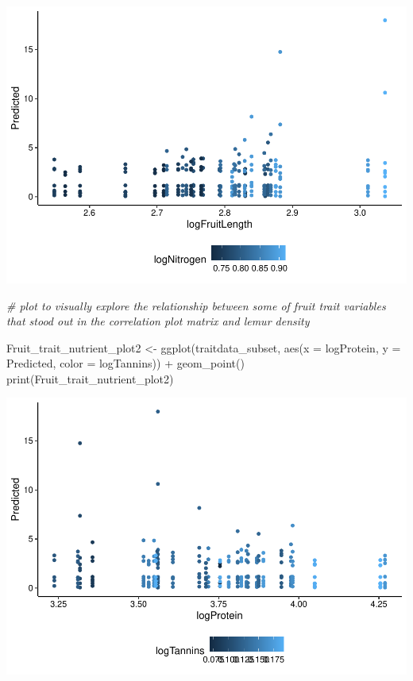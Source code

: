 \documentclass[
  12pt,
]{article}
\newenvironment{Shaded}{\begin{snugshade}}{\end{snugshade}}
\newcommand{\AttributeTok}[1]{\textcolor[rgb]{0.77,0.63,0.00}{#1}}
\newcommand{\CommentTok}[1]{\textcolor[rgb]{0.56,0.35,0.01}{\textit{#1}}}
\newcommand{\FunctionTok}[1]{\textcolor[rgb]{0.00,0.00,0.00}{#1}}
\newcommand{\NormalTok}[1]{#1}
\newcommand{\OtherTok}[1]{\textcolor[rgb]{0.56,0.35,0.01}{#1}}
\newcommand{\SpecialCharTok}[1]{\textcolor[rgb]{0.00,0.00,0.00}{#1}}
\begin{document}
\includegraphics{project_draft_files/figure-latex/unnamed-chunk-5-2.pdf}

\begin{Shaded}
\begin{Highlighting}[]
\CommentTok{\# plot to visually explore the relationship between some of fruit trait variables that stood out in the correlation plot matrix and lemur density}

\NormalTok{Fruit\_trait\_nutrient\_plot2 }\OtherTok{\textless{}{-}} \FunctionTok{ggplot}\NormalTok{(traitdata\_subset, }\FunctionTok{aes}\NormalTok{(}\AttributeTok{x =}\NormalTok{ logProtein, }\AttributeTok{y =}\NormalTok{ Predicted, }\AttributeTok{color =}\NormalTok{ logTannins)) }\SpecialCharTok{+}
  \FunctionTok{geom\_point}\NormalTok{()}
\FunctionTok{print}\NormalTok{(Fruit\_trait\_nutrient\_plot2)}
\end{Highlighting}
\end{Shaded}

\includegraphics{project_draft_files/figure-latex/unnamed-chunk-5-3.pdf}
\end{document}
